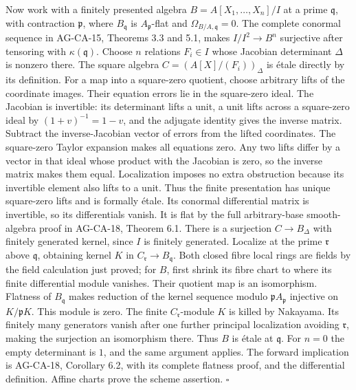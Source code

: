 \documentclass[11pt,a4paper,openany]{report}
\begin{document}
Now work with a finitely presented algebra \(B=A[X_1,\ldots,X_n]/I\) at a prime \(\mathfrak q\), with contraction \(\mathfrak p\), where \(B_{\mathfrak q}\) is \(A_{\mathfrak p}\)-flat and \(\Omega_{B/A,\mathfrak q}=0\). The complete conormal sequence in AG-CA-15, Theorems 3.3 and 5.1, makes \(I/I^2\to B^n\) surjective after tensoring with \(\kappa(\mathfrak q)\). Choose \(n\) relations \(F_i\in I\) whose Jacobian determinant \(\Delta\) is nonzero there. The square algebra \(C=(A[X]/(F_i))_\Delta\) is étale directly by its definition. For a map into a square-zero quotient, choose arbitrary lifts of the coordinate images. Their equation errors lie in the square-zero ideal. The Jacobian is invertible: its determinant lifts a unit, a unit lifts across a square-zero ideal by \((1+v)^{-1}=1-v\), and the adjugate identity gives the inverse matrix. Subtract the inverse-Jacobian vector of errors from the lifted coordinates. The square-zero Taylor expansion makes all equations zero. Any two lifts differ by a vector in that ideal whose product with the Jacobian is zero, so the inverse matrix makes them equal. Localization imposes no extra obstruction because its invertible element also lifts to a unit. Thus the finite presentation has unique square-zero lifts and is formally étale. Its conormal differential matrix is invertible, so its differentials vanish. It is flat by the full arbitrary-base smooth-algebra proof in AG-CA-18, Theorem 6.1. There is a surjection \(C\to B_\Delta\) with finitely generated kernel, since \(I\) is finitely generated. Localize at the prime \(\mathfrak r\) above \(\mathfrak q\), obtaining kernel \(K\) in \(C_{\mathfrak r}\to B_{\mathfrak q}\). Both closed fibre local rings are fields by the field calculation just proved; for \(B\), first shrink its fibre chart to where its finite differential module vanishes. Their quotient map is an isomorphism. Flatness of \(B_{\mathfrak q}\) makes reduction of the kernel sequence modulo \(\mathfrak pA_{\mathfrak p}\) injective on \(K/\mathfrak pK\). This module is zero. The finite \(C_{\mathfrak r}\)-module \(K\) is killed by Nakayama. Its finitely many generators vanish after one further principal localization avoiding \(\mathfrak r\), making the surjection an isomorphism there. Thus \(B\) is étale at \(\mathfrak q\). For \(n=0\) the empty determinant is \(1\), and the same argument applies. The forward implication is AG-CA-18, Corollary 6.2, with its complete flatness proof, and the differential definition. Affine charts prove the scheme assertion. \(\square\)
\end{document}
